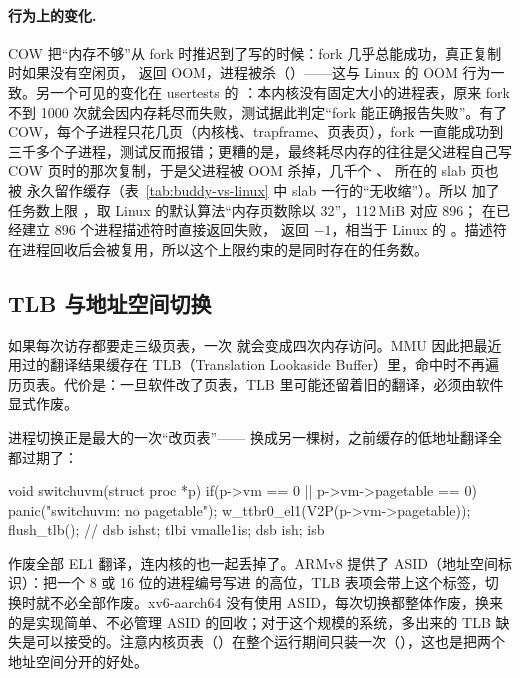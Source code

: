 \paragraph{行为上的变化.} COW 把“内存不够”从 fork 时推迟到了写的时候：fork 几乎总能成功，真正复制时如果没有空闲页， 返回 OOM，进程被杀（）——这与 Linux 的 OOM 行为一致。另一个可见的变化在 usertests 的 ：本内核没有固定大小的进程表，原来 fork 不到 1000 次就会因内存耗尽而失败，测试据此判定“fork 能正确报告失败”。有了 COW，每个子进程只花几页（内核栈、trapframe、页表页），fork 一直能成功到三千多个子进程，测试反而报错；更糟的是，最终耗尽内存的往往是父进程自己写 COW 页时的那次复制，于是父进程被 OOM 杀掉，几千个 、 所在的 slab 页也被  永久留作缓存（表~\ref{tab:buddy-vs-linux} 中 slab 一行的“无收缩”）。所以  加了任务数上限 ，取 Linux  的默认算法“内存页数除以 32”，112\,MiB 对应 896； 在已经建立 896 个进程描述符时直接返回失败， 返回 $-1$，相当于 Linux 的 。描述符在进程回收后会被复用，所以这个上限约束的是同时存在的任务数。

\subsection{TLB 与地址空间切换}

如果每次访存都要走三级页表，一次  就会变成四次内存访问。MMU 因此把最近用过的翻译结果缓存在 TLB（Translation Lookaside Buffer）里，命中时不再遍历页表。代价是：一旦软件改了页表，TLB 里可能还留着旧的翻译，必须由软件显式作废。

进程切换正是最大的一次“改页表”—— 换成另一棵树，之前缓存的低地址翻译全都过期了：

\begin{ccode}
void switchuvm(struct proc *p) {
  if(p->vm == 0 || p->vm->pagetable == 0) panic("switchuvm: no pagetable");
  w_ttbr0_el1(V2P(p->vm->pagetable));
  flush_tlb();                 // dsb ishst; tlbi vmalle1is; dsb ish; isb
}
\end{ccode}

 作废全部 EL1 翻译，连内核的也一起丢掉了。ARMv8 提供了 ASID（地址空间标识）：把一个 8 或 16 位的进程编号写进  的高位，TLB 表项会带上这个标签，切换时就不必全部作废。xv6-aarch64 没有使用 ASID，每次切换都整体作废，换来的是实现简单、不必管理 ASID 的回收；对于这个规模的系统，多出来的 TLB 缺失是可以接受的。注意内核页表（）在整个运行期间只装一次（），这也是把两个地址空间分开的好处。


